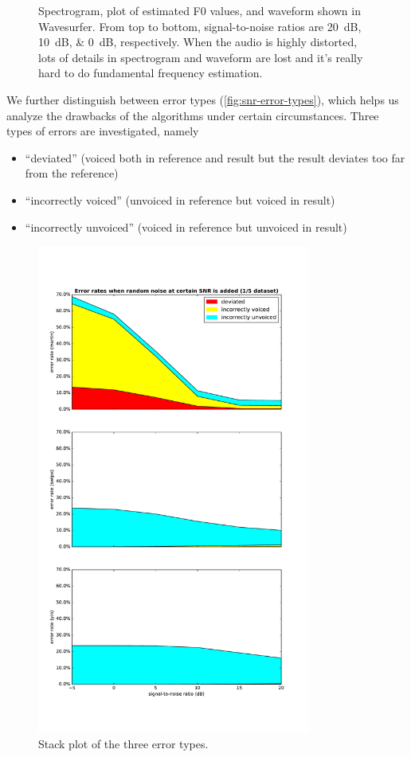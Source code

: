 \documentclass[11pt,a4paper]{report}
\begin{document}
\begin{figure}[htbp]
  \caption[Visualization of distortions.]{Spectrogram, plot of estimated F0 values, and waveform shown in Wavesurfer.
    From top to bottom, signal-to-noise ratios are \SIlist{20;10;0}{\deci\bel}, respectively.
    When the audio is highly distorted, lots of details in spectrogram and waveform are lost and it's really hard to do fundamental frequency estimation.}
  \label{fig:snr-compare}
\end{figure}

We further distinguish between error types (\autoref{fig:snr-error-types}), which helps us analyze the drawbacks of the algorithms under certain circumstances.
Three types of errors are investigated, namely

\begin{itemize}
  \item \enquote{deviated} (voiced both in reference and result but the result deviates too far from the reference)
  \item \enquote{incorrectly voiced} (unvoiced in reference but voiced in result)
  \item \enquote{incorrectly unvoiced} (voiced in reference but unvoiced in result)
\end{itemize}

\begin{figure}[htbp]
  \centering
  \includegraphics[width=0.8\textwidth]{error_rates_vs_snrs_error_types.pdf}
  \caption{Stack plot of the three error types.} \label{fig:snr-error-types}
\end{figure}
\end{document}
